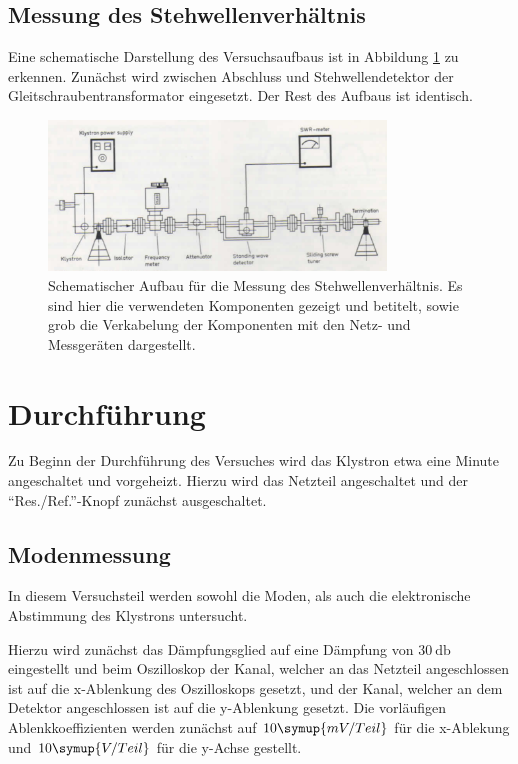         \subsection{Messung des Stehwellenverhältnis \label{ssec:3.3}}
        Eine schematische Darstellung des Versuchsaufbaus ist in Abbildung \ref{fig:5} zu erkennen.
        Zunächst wird zwischen Abschluss und Stehwellendetektor der Gleitschraubentransformator eingesetzt.
        Der Rest des Aufbaus ist identisch.
        \begin{figure}[H]
            \centering
            \includegraphics[width=0.8\textwidth]{pics/v53_3.png}
            \caption{Schematischer Aufbau für die Messung des Stehwellenverhältnis. Es sind hier die verwendeten Komponenten gezeigt und betitelt, sowie grob die Verkabelung der Komponenten mit den Netz- und Messgeräten dargestellt.\cite{Mikro}}
            \label{fig:5}
        \end{figure}
%
%
    \section{Durchführung}
        Zu Beginn der Durchführung des Versuches wird das Klystron etwa eine Minute angeschaltet und vorgeheizt.
        Hierzu wird das Netzteil angeschaltet und der \enquote{Res./Ref.}-Knopf zunächst ausgeschaltet.
        \subsection{Modenmessung}
            In diesem Versuchsteil werden sowohl die Moden, als auch die elektronische Abstimmung des Klystrons untersucht.
            
            Hierzu wird zunächst das Dämpfungsglied auf eine Dämpfung von $\SI{30}{\decibel}$ eingestellt und beim Oszilloskop der Kanal, welcher an das Netzteil angeschlossen ist auf die x-Ablenkung des Oszilloskops gesetzt, und der Kanal, welcher an dem Detektor angeschlossen ist auf die y-Ablenkung gesetzt.
            Die vorläufigen Ablenkkoeffizienten werden zunächst auf $10\symup{mV/Teil}$ für die x-Ablekung und $10\symup{V/Teil}$ für die y-Achse gestellt.

